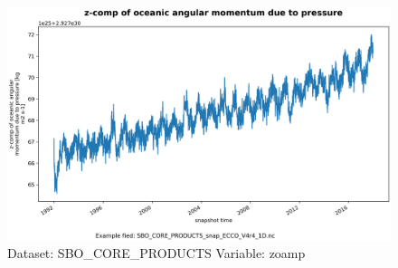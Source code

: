 \begin{figure}[H]
\centering
\includegraphics[width=\textwidth]{../images/plots/oneD_plots/SBO_Core_Products/zoamp.png}
\caption{Dataset: SBO\_CORE\_PRODUCTS Variable: zoamp}
\label{tab:table-SBO_CORE_PRODUCTS_zoamp-Plot}
\end{figure}
\pagebreak
